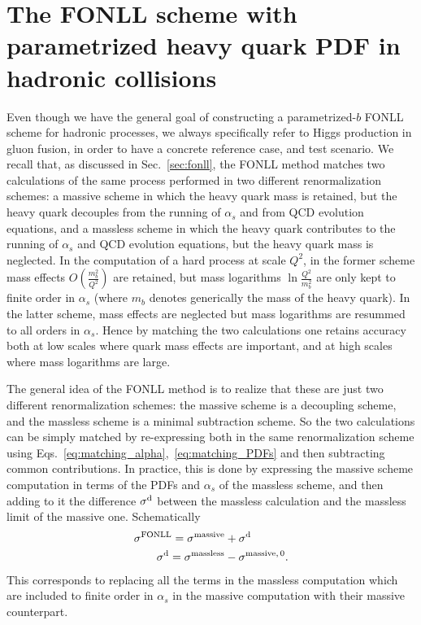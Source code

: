 \section{The FONLL scheme with parametrized heavy quark PDF
  in hadronic collisions}
\label{sec:FONLL-HI}

Even though we have the general goal of constructing a parametrized-$b$
FONLL scheme for hadronic processes, we  always specifically refer to Higgs
production in gluon fusion, in order to have  a concrete reference
case, and  test scenario. We recall that, as discussed in Sec.~\ref{sec:fonll}, the FONLL
method matches two calculations of the same process
performed in two different renormalization schemes: a massive scheme
in which the heavy quark mass is retained, but the heavy quark
decouples from the running of $\alpha_s$ and from QCD evolution
equations, and a massless scheme in which the heavy quark contributes
to the running of $\alpha_s$ and QCD evolution
equations, but the heavy quark mass is neglected.
In the computation of a hard process at scale $Q^2$, in the former scheme
mass effects $O\left(\frac {m_b^2}{Q^2}\right)$
are retained, but mass logarithms $\ln\frac{Q^2}{m_b^2}$
 are only
kept to finite order in $\alpha_s$ (where $m_b$ denotes generically
the mass of the heavy quark). In the latter scheme, mass effects
are neglected but mass logarithms are resummed to all orders in
$\alpha_s$. Hence by matching the two calculations one retains
accuracy both at low scales where quark mass effects are important, and
at high scales where mass logarithms are large.

The general idea of the FONLL method is to realize that these are just
two different renormalization schemes: the massive scheme is a
decoupling scheme, and the massless scheme is a minimal subtraction
scheme. So the two calculations can be simply matched by re-expressing
both in the same renormalization scheme using Eqs.~\eqref{eq:matching_alpha},~\eqref{eq:matching_PDFs}
and then subtracting common contributions. In practice, this is done by expressing the massive
scheme computation in terms of the PDFs and $\alpha_s$ of the
massless scheme, and then adding to it the difference $\sigma ^{\rm
  d}$
between the massless calculation and the massless limit of the
massive one. Schematically
\begin{align}\label{eq:fonlldef}
&  \sigma^{\text{FONLL}} = \sigma^{\rm massive} +\sigma ^{\rm d}\\
&\qquad \sigma ^{\rm d}=\sigma^{\rm massless}-\sigma^{\rm massive,\,0}.\label{eq:fonlldiff}
\end{align}
This corresponds to replacing all the terms in the massless
computation which are included to finite order in $\alpha_s$ in the
massive computation with their massive counterpart.

